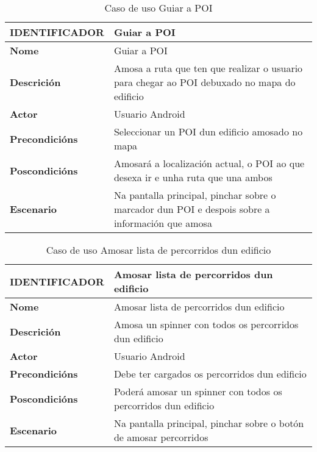 \begin{table}[tbp]
	\begin{tabular}{|l|p{10cm}|}
		\hline 
		\textbf{IDENTIFICADOR}	& \textbf{Guiar a POI} \\ 
		\hline 
		\textbf{Nome} & Guiar a POI \\ 
		\hline 
		\textbf{Descrición} & Amosa a ruta que ten que realizar o usuario para chegar ao POI debuxado no mapa do edificio \\ 
		\hline 
		\textbf{Actor} & Usuario Android \\ 
		\hline 
		\textbf{Precondicións} & Seleccionar un POI dun edificio amosado no mapa \\ 
		\hline 
		\textbf{Poscondicións} & Amosará a localización actual, o POI ao que desexa ir e unha ruta que una ambos \\ 
		\hline 
		\textbf{Escenario} & Na pantalla principal, pinchar sobre o marcador dun POI e despois sobre a información que amosa \\ 
		\hline 
	\end{tabular}
	\caption{Caso de uso Guiar a POI}
	\label{tab:cuGuiarPOI}
\end{table}

\begin{table}[tbp]
	\begin{tabular}{|l|p{10cm}|}
		\hline 
		\textbf{IDENTIFICADOR}	& \textbf{Amosar lista de percorridos dun edificio} \\ 
		\hline 
		\textbf{Nome} & Amosar lista de percorridos dun edificio \\ 
		\hline 
		\textbf{Descrición} & Amosa un spinner con todos os percorridos dun edificio \\ 
		\hline 
		\textbf{Actor} & Usuario Android \\ 
		\hline 
		\textbf{Precondicións} & Debe ter cargados os percorridos dun edificio \\ 
		\hline 
		\textbf{Poscondicións} & Poderá amosar un spinner con todos os percorridos dun edificio \\ 
		\hline 
		\textbf{Escenario} & Na pantalla principal, pinchar sobre o botón de amosar percorridos \\ 
		\hline 
	\end{tabular}
	\caption{Caso de uso Amosar lista de percorridos dun edificio}
	\label{tab:cuAmosarListaPercorrido}
\end{table}

